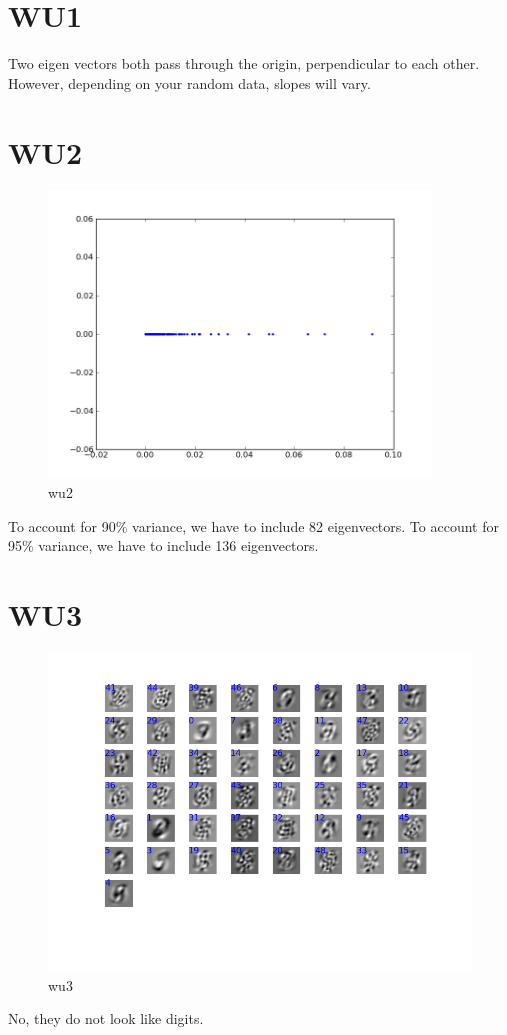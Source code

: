 \section*{WU1}
Two eigen vectors both pass through the origin, perpendicular to each other. However, depending on your random data, slopes will vary. 

\section*{WU2}

\begin{figure}[here]
	\center
	\caption{wu2}
	\label{fig:wu2}
	\includegraphics[width=4.0in]{img/wu2.png}
\end{figure}

To account for 90\% variance, we have to include 82 eigenvectors.
To account for 95\% variance, we have to include 136 eigenvectors.


\section*{WU3}
\begin{figure}[here]
	\center
	\caption{wu3}
	\label{fig:wu3}
	\includegraphics[width=6.0in]{img/wu3.png}
\end{figure}
No, they do not look like digits.